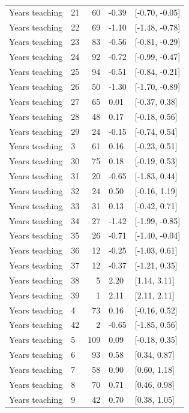 \begin{tabular}{llrll}
Years teaching & 21 & 60 & -0.39 & {}[-0.70, -0.05]\\
Years teaching & 22 & 69 & -1.10 & {}[-1.48, -0.78]\\
Years teaching & 23 & 83 & -0.56 & {}[-0.81, -0.29]\\
Years teaching & 24 & 92 & -0.72 & {}[-0.99, -0.47]\\
\addlinespace
Years teaching & 25 & 94 & -0.51 & {}[-0.84, -0.21]\\
Years teaching & 26 & 50 & -1.30 & {}[-1.70, -0.89]\\
Years teaching & 27 & 65 & 0.01 & {}[-0.37, 0.38]\\
Years teaching & 28 & 48 & 0.17 & {}[-0.18, 0.56]\\
Years teaching & 29 & 24 & -0.15 & {}[-0.74, 0.54]\\
\addlinespace
Years teaching & 3 & 61 & 0.16 & {}[-0.23, 0.51]\\
Years teaching & 30 & 75 & 0.18 & {}[-0.19, 0.53]\\
Years teaching & 31 & 20 & -0.65 & {}[-1.83, 0.44]\\
Years teaching & 32 & 24 & 0.50 & {}[-0.16, 1.19]\\
Years teaching & 33 & 31 & 0.13 & {}[-0.42, 0.71]\\
\addlinespace
Years teaching & 34 & 27 & -1.42 & {}[-1.99, -0.85]\\
Years teaching & 35 & 26 & -0.71 & {}[-1.40, -0.04]\\
Years teaching & 36 & 12 & -0.25 & {}[-1.03, 0.61]\\
Years teaching & 37 & 12 & -0.37 & {}[-1.21, 0.35]\\
Years teaching & 38 & 5 & 2.20 & {}[1.14, 3.11]\\
\addlinespace
Years teaching & 39 & 1 & 2.11 & {}[2.11, 2.11]\\
Years teaching & 4 & 73 & 0.16 & {}[-0.16, 0.52]\\
Years teaching & 42 & 2 & -0.65 & {}[-1.85, 0.56]\\
Years teaching & 5 & 109 & 0.09 & {}[-0.18, 0.35]\\
Years teaching & 6 & 93 & 0.58 & {}[0.34, 0.87]\\
\addlinespace
Years teaching & 7 & 58 & 0.90 & {}[0.60, 1.18]\\
Years teaching & 8 & 70 & 0.71 & {}[0.46, 0.98]\\
Years teaching & 9 & 42 & 0.70 & {}[0.38, 1.05]\\
\bottomrule
\end{tabular}
